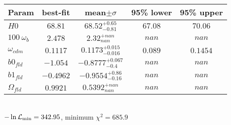 \begin{tabular}{|l|c|c|c|c|} 
 \hline 
Param & best-fit & mean$\pm\sigma$ & 95\% lower & 95\% upper \\ \hline 
$H0$ &$68.81$ & $68.52_{-0.81}^{+0.65}$ & $67.08$ & $70.06$ \\ 
$100~\omega_{b }$ &$2.478$ & $2.32_{nan}^{+nan}$ & $nan$ & $nan$ \\ 
$\omega_{cdm }$ &$0.1117$ & $0.1173_{-0.016}^{+0.015}$ & $0.089$ & $0.1454$ \\ 
$b0_{fld }$ &$-1.054$ & $-0.8777_{-0.4}^{+0.067}$ & $nan$ & $nan$ \\ 
$b1_{fld }$ &$-0.4962$ & $-0.9554_{-0.16}^{+0.86}$ & $nan$ & $nan$ \\ 
$\Omega_{fld }$ &$0.9921$ & $0.5392_{nan}^{+nan}$ & $nan$ & $nan$ \\ 
\hline 
 \end{tabular} \\ 
$-\ln{\cal L}_\mathrm{min} =342.95$, minimum $\chi^2=685.9$ \\ 
